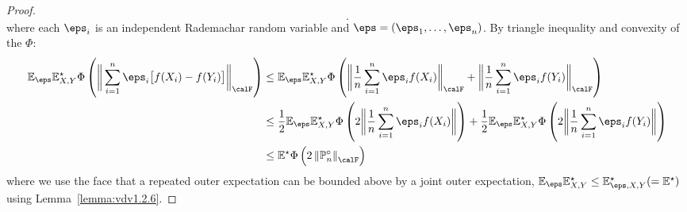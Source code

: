 \begin{proof}
\[	.\]
	where each \(\eps_i\) is an independent Rademachar random variable and  \(\eps = (\eps_1,\dots,\eps_n)\). By triangle inequality and convexity of the \(\Phi\):
	\begin{align*}
		\E_\eps\E^\star_{X,Y}\Phi\left(\bigg\|\sum_{i=1}^n \eps_i\big[f(X_i)-f(Y_i)\big]\bigg\|_\calF\right) 
		&\leq \E_\eps\E^\star_{X,Y}\Phi\left(\bigg\|\frac{1}{n}\sum_{i=1}^n \eps_if(X_i)\bigg\|_\calF + \bigg\|\frac{1}{n}\sum_{i=1}^n \eps_if(Y_i) \bigg\|_\calF\right)\\
		&\leq  \frac{1}{2}\E_\eps\E^\star_{X,Y}\Phi\left(2\bigg\|\frac{1}{n} \sum_{i=1}^n \eps_if(X_i)\bigg\|\right) + \frac{1}{2}\E_\eps\E^\star_{X,Y}\Phi\left(2\bigg\|\frac{1}{n} \sum_{i=1}^n \eps_if(Y_i)\bigg\|\right) \\
		&\leq \E^\star\Phi\left(2\left\|\P_n^\circ\right\|_\calF\right)
	\end{align*}
	where we use the face that a repeated outer expectation can be bounded above by a joint outer expectation, \(\E_\eps\E^\star_{X,Y} \leq \E^\star_{\eps,X,Y} (=\E^\star)\) using Lemma~\ref{lemma:vdv1.2.6}.
\end{proof}

